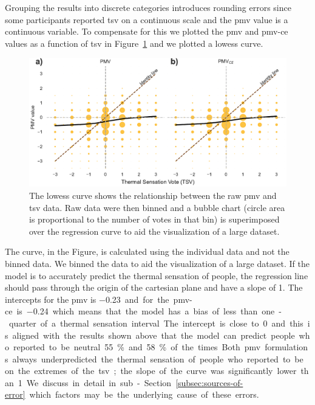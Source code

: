 Grouping the results into discrete categories introduces rounding errors since some participants reported \ac{tsv} on a continuous scale and the \ac{pmv} value is a continuous variable.
To compensate for this we plotted the \ac{pmv} and \ac{pmv-ce} values as a function of \ac{tsv} in Figure~\ref{fig:bubble_models_vs_tsv} and we plotted a \ac{lowess} curve.
\begin{figure}[htb!]
    \centering
    \includegraphics[width=\textwidth]{figures/bubble_models_vs_tsv}
    \caption{The \ac{lowess} curve shows the relationship between the raw \ac{pmv} and \ac{tsv} data.
    Raw data were then binned and a bubble chart (circle area is proportional to the number of votes in that bin) is superimposed over the regression curve to aid the visualization of a large dataset.}
    \label{fig:bubble_models_vs_tsv}
\end{figure}
The curve, in the Figure, is calculated using the individual data and not the binned data.
We binned the data to aid the visualization of a large dataset.
If the model is to accurately predict the thermal sensation of people, the regression line should pass through the origin of the cartesian plane and have a slope of 1.
The intercepts for the \ac{pmv} is \qty{-0.23} and for the \ac{pmv-ce} is \qty{-0.24} which means that the model has a bias of less than one-quarter of a thermal sensation interval. 
The intercept is close to 0 and this is aligned with the results shown above that the model can predict people who reported to be neutral \qty{55}{\percent} and \qty{58}{\percent} of the times.
Both \ac{pmv} formulations always underpredicted the thermal sensation of people who reported to be on the extremes of the \ac{tsv}; the slope of the curve was significantly lower than 1.
We discuss in detail in sub-Section~\ref{subsec:sources-of-error} which factors may be the underlying cause of these errors.

